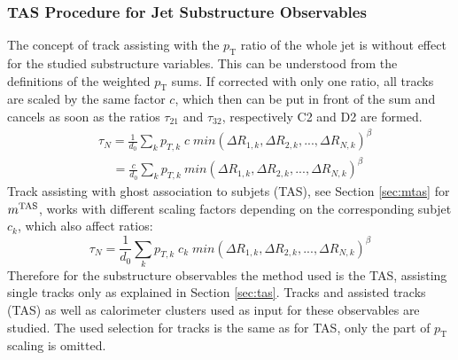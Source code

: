 \subsubsection{TAS Procedure for Jet Substructure Observables}
The concept of track assisting with the $p_{\mathrm{T}}$ ratio of the whole jet is without effect for the studied substructure variables. This can be understood from the definitions of the weighted $p_{\mathrm{T}}$ sums. If corrected with only one ratio, all tracks are scaled by the same factor $c$, which then can be put in front of the sum and cancels as soon as the ratios $\tau_{21}$ and $\tau_{32}$, respectively C2 and D2 are formed.
\begin{equation}
\begin{aligned}
 & \tau_N ={} \frac{1}{d_0}\sum_k p_{T,k} \; c \; min(\Delta R_{1,k},\Delta R_{2,k},...,\Delta R_{N,k})^{\beta} \\
 & \; \; \; \;  ={} \frac{c}{d_0}\sum_k p_{T,k}\:min(\Delta R_{1,k},\Delta R_{2,k},...,\Delta R_{N,k})^{\beta}
\end{aligned}
\end{equation}
Track assisting with ghost association to subjets (TAS), see Section \ref{sec:mtas} for $m^\textrm{TAS}$, works with different scaling factors depending on the corresponding subjet $c_k$, which also affect ratios:
\begin{equation}
\tau_N = \frac{1}{d_0}\sum_k p_{T,k} \; c_k \; min(\Delta R_{1,k},\Delta R_{2,k},...,\Delta R_{N,k})^{\beta} 
\end{equation}\label{eq:tas_ta}
Therefore for the substructure observables the method used is the TAS, assisting single tracks only as explained in Section \ref{sec:tas}. Tracks and assisted tracks (TAS) as well as calorimeter clusters used as input for these observables are studied. The used selection for tracks is the same as for TAS, only the part of $p_{\text{T}}$ scaling is omitted.
